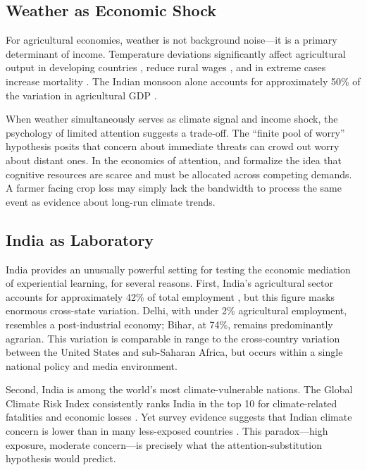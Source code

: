 \documentclass[12pt]{article}
\begin{document}
\subsection{Weather as Economic Shock}

For agricultural economies, weather is not background noise---it is a primary determinant of income. Temperature deviations significantly affect agricultural output in developing countries \citep{delljonesolen2012, burkeetalwb}, reduce rural wages \citep{jayachandran2006}, and in extreme cases increase mortality \citep{burgess2017weather, droughtflood2018}. The Indian monsoon alone accounts for approximately 50\% of the variation in agricultural GDP \citep{gadgil2006}.

When weather simultaneously serves as climate signal and income shock, the psychology of limited attention suggests a trade-off. The ``finite pool of worry'' hypothesis \citep{weber2006} posits that concern about immediate threats can crowd out worry about distant ones. In the economics of attention, \citet{sims2003rational} and \citet{gabaix2014sparsity} formalize the idea that cognitive resources are scarce and must be allocated across competing demands. A farmer facing crop loss may simply lack the bandwidth to process the same event as evidence about long-run climate trends.

\subsection{India as Laboratory}

India provides an unusually powerful setting for testing the economic mediation of experiential learning, for several reasons. First, India's agricultural sector accounts for approximately 42\% of total employment \citep{wdi2023}, but this figure masks enormous cross-state variation. Delhi, with under 2\% agricultural employment, resembles a post-industrial economy; Bihar, at 74\%, remains predominantly agrarian. This variation is comparable in range to the cross-country variation between the United States and sub-Saharan Africa, but occurs within a single national policy and media environment.

Second, India is among the world's most climate-vulnerable nations. The Global Climate Risk Index consistently ranks India in the top 10 for climate-related fatalities and economic losses \citep{germanwatch2021}. Yet survey evidence suggests that Indian climate concern is lower than in many less-exposed countries \citep{pewresearch2021}. This paradox---high exposure, moderate concern---is precisely what the attention-substitution hypothesis would predict.
\end{document}

